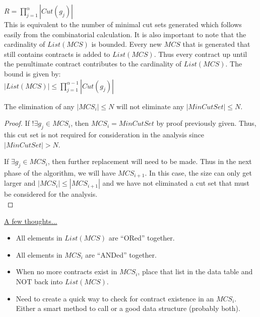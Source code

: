 $R = {\displaystyle \prod_{j=1}^{\alpha } |Cut(g_j)|}$ \\

This is equivalent to the number of minimal cut sets generated which follows easily from the combinatorial calculation. It is also important to note that the cardinality of $List(MCS)$ is bounded. Every new $MCS$ that is generated that still contains contracts is added to $List(MCS)$. Thus every contract up until the penultimate contract contributes to the cardinality of $List(MCS)$. The bound is given by: \\

$|List(MCS)| \leq {\displaystyle \prod_{j=1}^{\alpha -1} |Cut(g_j)|}$\\

\begin{theorem} 
The elimination of any $|MCS_i| \leq N$ will not eliminate any $|MinCutSet| \leq N$. \\

\begin{proof} 

If $!\exists g_j \in MCS_i$, then $MCS_i = MinCutSet$ by proof previously given. Thus, this cut set is not required for consideration in the analysis since $|MinCutSet| > N$. 

If $\exists g_j \in MCS_i$, then further replacement will need to be made. Thus in the next phase of the algorithm, we will have $MCS_{i+1}$. In this case, the size can only get larger and $|MCS_i| \leq |MCS_{i+1}|$ and we have not eliminated a cut set that must be considered for the analysis. \\

\end{proof}
\end{theorem}




\underline{A few thoughts...}
\begin{itemize}
\item All elements in $List(MCS)$ are ``ORed'' together.
\item All elements in $MCS_i$ are ``ANDed'' together.
\item When no more contracts exist in $MCS_i$, place that list in the data table and NOT back into $List(MCS)$. 
\item Need to create a quick way to check for contract existence in an $MCS_i$. Either a smart method to call or a good data structure (probably both). 

\end{itemize}





























